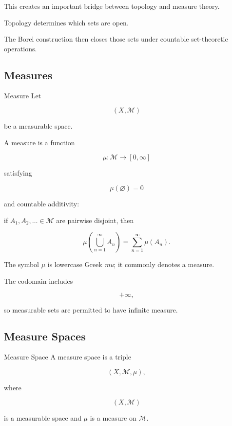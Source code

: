 This creates an important bridge between topology and measure theory.

Topology determines which sets are open.

The Borel construction then closes those sets under countable
set-theoretic operations.

\subsection{Measures}
\label{subsec:measures}

\begin{definitionbox}{Measure}
Let

\[
(X,\mathcal{M})
\]

be a measurable space.

A measure is a function

\[
\boxed{
\mu:\mathcal{M}\to[0,\infty]
}
\]

satisfying

\[
\boxed{
\mu(\varnothing)=0
}
\]

and countable additivity:

if \(A_1,A_2,\ldots\in\mathcal{M}\) are pairwise disjoint, then

\[
\boxed{
\mu\left(
\bigcup_{n=1}^{\infty}A_n
\right)
=
\sum_{n=1}^{\infty}\mu(A_n).
}
\]

The symbol \(\mu\) is lowercase Greek \emph{mu}; it commonly denotes a
measure.
\end{definitionbox}

The codomain includes

\[
+\infty,
\]

so measurable sets are permitted to have infinite measure.

\subsection{Measure Spaces}
\label{subsec:measure-spaces}

\begin{definitionbox}{Measure Space}
A measure space is a triple

\[
\boxed{
(X,\mathcal{M},\mu),
}
\]

where

\[
(X,\mathcal{M})
\]

is a measurable space and \(\mu\) is a measure on \(\mathcal{M}\).
\end{definitionbox}


